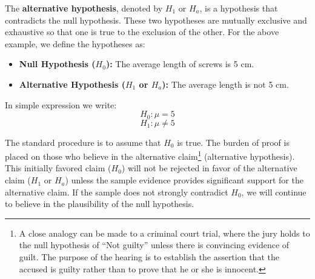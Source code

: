 \documentclass[twoside]{book}
\begin{document}
The \textbf{alternative hypothesis}, denoted by $H_1$ or $H_a$, is a hypothesis that contradicts the null hypothesis. These two hypotheses are mutually exclusive and
exhaustive so that one is true to the exclusion of the
other. For the above example, we define the hypotheses as:

\begin{itemize}
    \item \textbf{Null Hypothesis ($H_0$):} The average length of screws is 5 cm.
    \item \textbf{Alternative Hypothesis ($H_1$ or $H_a$):} The average length is not 5 cm.
\end{itemize}

In simple expression we write:
    $$H_0: \mu = 5$$
    $$H_1 : \mu \neq 5$$


The standard procedure is to assume that $H_0$ is true. The burden of proof is placed on those who believe in the alternative claim\footnote{A close analogy can be made to a criminal court trial, where the jury holds to the null hypothesis of ``Not guilty'' unless there is convincing evidence of guilt.  The purpose of the hearing is to establish the assertion that the accused is guilty rather than to prove that he or she is innocent.} (alternative hypothesis). This initially favored claim ($H_0$) will not be rejected in favor of the alternative claim ($H_1$ or $H_a$) unless the sample evidence provides significant support for the alternative claim. If the sample does not strongly contradict $H_0$, we will continue to believe in the plausibility of the null hypothesis.

\vspace{3mm}
\begin{center}
\end{center}
\end{document}
